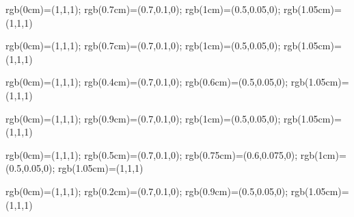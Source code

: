 \documentclass{article}
\begin{document}

% 
{rgb(0cm)=(1,1,1);
rgb(0.7cm)=(0.7,0.1,0); rgb(1cm)=(0.5,0.05,0); rgb(1.05cm)=(1,1,1)}

% 
{rgb(0cm)=(1,1,1);
rgb(0.7cm)=(0.7,0.1,0); rgb(1cm)=(0.5,0.05,0); rgb(1.05cm)=(1,1,1)}

% 
{rgb(0cm)=(1,1,1);
rgb(0.4cm)=(0.7,0.1,0); rgb(0.6cm)=(0.5,0.05,0); rgb(1.05cm)=(1,1,1)}


% 
{rgb(0cm)=(1,1,1);
rgb(0.9cm)=(0.7,0.1,0); rgb(1cm)=(0.5,0.05,0); rgb(1.05cm)=(1,1,1)}


% 
{rgb(0cm)=(1,1,1);
rgb(0.5cm)=(0.7,0.1,0); rgb(0.75cm)=(0.6,0.075,0); rgb(1cm)=(0.5,0.05,0); rgb(1.05cm)=(1,1,1)}

% 
{rgb(0cm)=(1,1,1);
rgb(0.2cm)=(0.7,0.1,0); rgb(0.9cm)=(0.5,0.05,0); rgb(1.05cm)=(1,1,1)}


 
\end{document}
